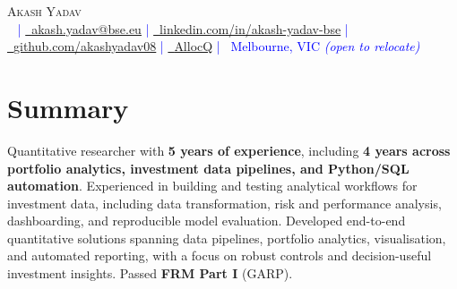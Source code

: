 

\begin{center}
    {\Huge \scshape Akash Yadav} \\[3pt]
    \footnotesize
    \textcolor{blue}{
        \raisebox{-0.1\height}\faPhone\ \underline{\href{tel:\phonenum}{\phonenum}} | 
        \href{mailto:akash.yadav@bse.eu}{\raisebox{-0.2\height}\faEnvelope\  \underline{akash.yadav@bse.eu}} | 
        \href{https://www.linkedin.com/in/akash-yadav-bse}{\raisebox{-0.2\height}\faLinkedin\ \underline{linkedin.com/in/akash-yadav-bse}} |
        \href{https://github.com/akashyadav08}
        {\raisebox{-0.2\height}\faGithub\ \underline{github.com/akashyadav08}} |
        \href{https://www.allocq.com/}
        {\raisebox{-0.1\height}\faAllocQ\ \underline{AllocQ}} | 
        {\raisebox{-0.1\height}\faMapMarker\ Melbourne, VIC} \textit{(open to relocate)}
    }
\end{center}

\section*{Summary}
\noindent
\small
\justifying %
Quantitative researcher with \textbf{5 years of experience}, including \textbf{4 years across portfolio analytics, investment data pipelines, and Python/SQL automation}. Experienced in building and testing analytical workflows for investment data, including data transformation, risk and performance analysis, dashboarding, and reproducible model evaluation. Developed end-to-end quantitative solutions spanning data pipelines, portfolio analytics, visualisation, and automated reporting, with a focus on robust controls and decision-useful investment insights. Passed \textbf{FRM Part I} (GARP).

